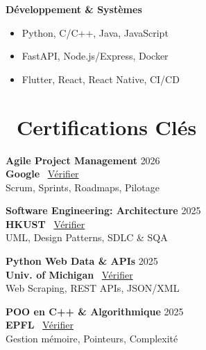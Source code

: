 \documentclass[a4paper,9pt]{extarticle}
\def\faAward{}%
\def\faExternalLink*{}%
\begin{document}
\begin{minipage}[t]{0.405\textwidth}
  \vspace{2pt}
  {\footnotesize \textbf{\color{accent} Développement \& Systèmes}}
  \begin{itemize}
    \item Python, C/C++, Java, JavaScript
    \item FastAPI, Node.js/Express, Docker
    \item Flutter, React, React Native, CI/CD
  \end{itemize}

  \vspace{3pt}

  \section{\faAward\ Certifications Clés}

  \textbf{\color{primary}\small Agile Project Management} \hfill {\scriptsize\color{textmuted} 2026}\\
  {\footnotesize \textbf{Google} \textbar\ \href{https://www.coursera.org/account/accomplishments/verify/G2064X5FGLVB}{Vérifier \faExternalLink*}}\\
  {\scriptsize\color{textdark} Scrum, Sprints, Roadmaps, Pilotage}

  \vspace{2.5pt}
  \textbf{\color{primary}\small Software Engineering: Architecture} \hfill {\scriptsize\color{textmuted} 2025}\\
  {\footnotesize \textbf{HKUST} \textbar\ \href{https://www.coursera.org/account/accomplishments/verify/PYISBTHNMK4R}{Vérifier \faExternalLink*}}\\
  {\scriptsize\color{textdark} UML, Design Patterns, SDLC \& SQA}

  \vspace{2.5pt}
  \textbf{\color{primary}\small Python Web Data \& APIs} \hfill {\scriptsize\color{textmuted} 2025}\\
  {\footnotesize \textbf{Univ. of Michigan} \textbar\ \href{https://www.coursera.org/account/accomplishments/verify/3HIOWYMU2G7V}{Vérifier \faExternalLink*}}\\
  {\scriptsize\color{textdark} Web Scraping, REST APIs, JSON/XML}

  \vspace{2.5pt}
  \textbf{\color{primary}\small POO en C++ \& Algorithmique} \hfill {\scriptsize\color{textmuted} 2025}\\
  {\footnotesize \textbf{EPFL} \textbar\ \href{https://www.coursera.org/account/accomplishments/verify/402FN9N1EN8K}{Vérifier \faExternalLink*}}\\
  {\scriptsize\color{textdark} Gestion mémoire, Pointeurs, Complexité}


\end{minipage}
\end{document}

